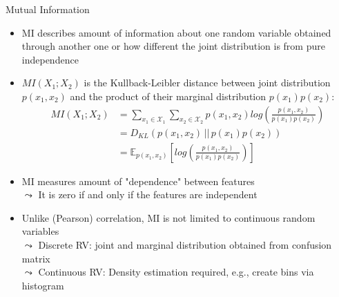 \documentclass[11pt,compress,t,notes=noshow, aspectratio=169, xcolor=table]{beamer}
\begin{document}
\begin{frame}{Mutual Information}
    \begin{itemize}
        \item MI describes amount of information about one random variable obtained through another one or how different the joint distribution is from pure independence
        \item $MI(X_1 ; X_2 )$ is the Kullback-Leibler distance between joint distribution $p(x_1, x_2)$ and the product of their marginal distribution $p(x_1) p(x_2)$:
        \begin{align*}
            MI(X_1 ; X_2 ) &= \sum_{x_1 \in \mathcal{X}_1} \sum_{x_2 \in \mathcal{X}_2} p(x_1, x_2) log\left(\frac{p(x_1, x_2)}{p(x_1) p(x_2)} \right) \\
            &= D_{KL} \left( p(x_1, x_2) \, || \, p(x_1) p(x_2) \right) \\
            &= \mathbb{E}_{p(x_1, x_2)} \left[ log\left(\frac{p(x_1, x_2)}{p(x_1) p(x_2)} \right) \right]
        \end{align*}
        \item MI measures amount of "dependence" between features\\
        $\leadsto$ It is zero if and only if the features are independent
        \item Unlike (Pearson) correlation, MI is not limited to continuous random variables\\
        $\leadsto$ Discrete RV: joint and marginal distribution obtained from confusion matrix\\
        $\leadsto$ Continuous RV: Density estimation required, e.g., create bins via histogram
    \end{itemize}
\end{frame}
\end{document}
